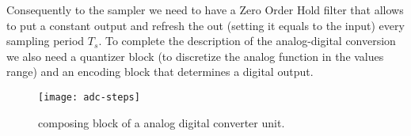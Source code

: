 		Consequently to the sampler we need to have a  Zero Order Hold filter that allows to put a constant output and refresh the out (setting it equals to the input) every sampling period $T_s$. To complete the description of the analog-digital conversion we also need a quantizer block (to discretize the analog function in the values range) and an encoding block that determines a digital output. 
		
		\begin{figure}[bht]
			\centering
			\texttt{[image: adc-steps]}
			\caption{composing block of a analog digital converter unit.}
		\end{figure}
	
		
	
	
	
	
	
	
	
	
	